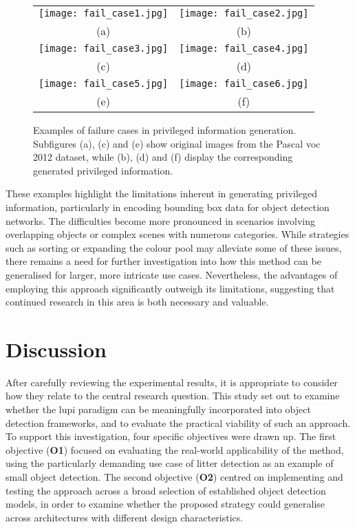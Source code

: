 \begin{figure}[!ht]
  \centering
  \begin{tabular}{cc}
    \texttt{[image: fail\_case1.jpg]} &
    \texttt{[image: fail\_case2.jpg]} \\
    \small (a) & \small (b) \\
    \addlinespace[1em]
    \texttt{[image: fail\_case3.jpg]} &
    \texttt{[image: fail\_case4.jpg]} \\
    \small (c) & \small (d) \\
    \addlinespace[1em]
    \texttt{[image: fail\_case5.jpg]} &
    \texttt{[image: fail\_case6.jpg]} \\
    \small (e) & \small (f) \\
  \end{tabular}
  \caption{Examples of failure cases in privileged information generation. Subfigures (a), (c) and (e) show original images from the Pascal \gls{voc} 2012 dataset, while (b), (d) and (f) display the corresponding generated privileged information.}
  \label{fig:fail_cases}
\end{figure}

These examples highlight the limitations inherent in generating privileged information, particularly in encoding bounding box data for object detection networks. The difficulties become more pronounced in scenarios involving overlapping objects or complex scenes with numerous categories. While strategies such as sorting or expanding the colour pool may alleviate some of these issues, there remains a need for further investigation into how this method can be generalised for larger, more intricate use cases. Nevertheless, the advantages of employing this approach significantly outweigh its limitations, suggesting that continued research in this area is both necessary and valuable.

\section{Discussion}
\label{sec:5_discussion}

After carefully reviewing the experimental results, it is appropriate to consider how they relate to the central research question. This study set out to examine whether the \gls{lupi} paradigm can be meaningfully incorporated into object detection frameworks, and to evaluate the practical viability of such an approach. To support this investigation, four specific objectives were drawn up. The first objective (\textbf{O1}) focused on evaluating the real-world applicability of the method, using the particularly demanding use case of litter detection as an example of small object detection. The second objective (\textbf{O2}) centred on implementing and testing the approach across a broad selection of established object detection models, in order to examine whether the proposed strategy could generalise across architectures with different design characteristics.

